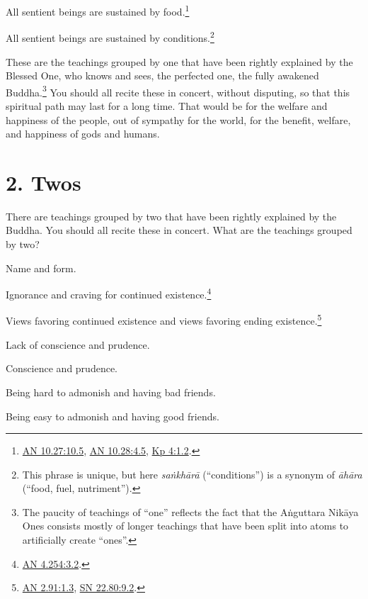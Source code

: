 \documentclass[12pt,openany]{book}%
\begin{document}
All sentient beings are sustained by food.\footnote{\href{https://suttacentral.net/an10.27/en/sujato\#10.5}{AN 10.27:10.5}, \href{https://suttacentral.net/an10.28/en/sujato\#4.5}{AN 10.28:4.5}, \href{https://suttacentral.net/kp4/en/sujato\#1.2}{Kp 4:1.2}. } 

All sentient beings are sustained by conditions.\footnote{This phrase is unique, but here \textit{\textsanskrit{saṅkhārā}} (“conditions”) is a synonym of \textit{\textsanskrit{āhāra}} (“food, fuel, nutriment”). } 

These are the teachings grouped by one that have been rightly explained by the Blessed One, who knows and sees, the perfected one, the fully awakened Buddha.\footnote{The paucity of teachings of “one” reflects the fact that the \textsanskrit{Aṅguttara} \textsanskrit{Nikāya} Ones consists mostly of longer teachings that have been split into atoms to artificially create “ones”. } You should all recite these in concert, without disputing, so that this spiritual path may last for a long time. That would be for the welfare and happiness of the people, out of sympathy for the world, for the benefit, welfare, and happiness of gods and humans. 

\section*{2. Twos }

There are teachings grouped by two that have been rightly explained by the Buddha. You should all recite these in concert. What are the teachings grouped by two? 

Name and form. 

Ignorance and craving for continued existence.\footnote{\href{https://suttacentral.net/an4.254/en/sujato\#3.2}{AN 4.254:3.2}. } 

Views favoring continued existence and views favoring ending existence.\footnote{\href{https://suttacentral.net/an2.91/en/sujato\#1.3}{AN 2.91:1.3}, \href{https://suttacentral.net/sn22.80/en/sujato\#9.2}{SN 22.80:9.2}. } 

Lack of conscience and prudence. 

Conscience and prudence. 

Being hard to admonish and having bad friends. 

Being easy to admonish and having good friends. 
\end{document}
